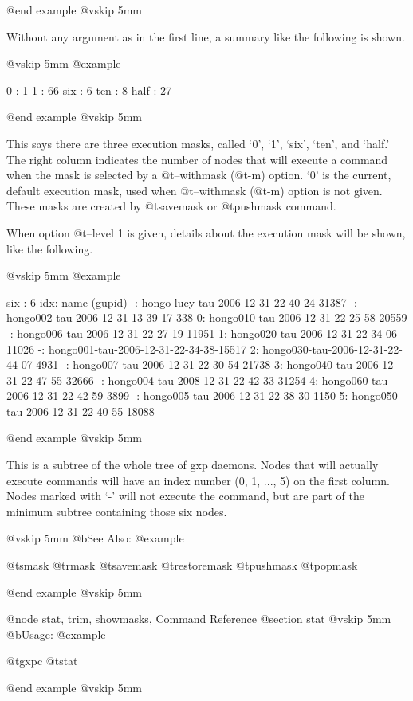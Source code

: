@end example
@vskip 5mm

Without any argument as in the first line, a summary like the
following is shown.

@vskip 5mm
@example

   0 : 1
   1 : 66
   six : 6
   ten : 8
   half : 27

@end example
@vskip 5mm

This says there are three execution masks, called `0', `1',
`six', `ten', and `half.' The right column indicates the number
of nodes that will execute a command when the mask is selected by
a @t{--withmask} (@t{-m}) option. `0' is the current, default execution
mask, used when @t{--withmask} (@t{-m}) option is not given. These
masks are created by @t{savemask} or @t{pushmask} command.

When option @t{--level} 1 is given, details about the execution mask
will be shown, like the following.

@vskip 5mm
@example

  six : 6
   idx: name (gupid)
     -: hongo-lucy-tau-2006-12-31-22-40-24-31387
     -:  hongo002-tau-2006-12-31-13-39-17-338
     0:   hongo010-tau-2006-12-31-22-25-58-20559
     -:  hongo006-tau-2006-12-31-22-27-19-11951
     1:   hongo020-tau-2006-12-31-22-34-06-11026
     -:  hongo001-tau-2006-12-31-22-34-38-15517
     2:   hongo030-tau-2006-12-31-22-44-07-4931
     -:  hongo007-tau-2006-12-31-22-30-54-21738
     3:   hongo040-tau-2006-12-31-22-47-55-32666
     -:  hongo004-tau-2008-12-31-22-42-33-31254
     4:   hongo060-tau-2006-12-31-22-42-59-3899
     -:  hongo005-tau-2006-12-31-22-38-30-1150
     5:   hongo050-tau-2006-12-31-22-40-55-18088

@end example
@vskip 5mm

This is a subtree of the whole tree of gxp daemons.  Nodes that will
actually execute commands will have an index number (0, 1, ..., 5) on
the first column. Nodes marked with `-' will not execute the
command, but are part of the minimum subtree containing those six
nodes.

@vskip 5mm
@b{See Also:}
@example

  @t{smask} @t{rmask} @t{savemask} @t{restoremask} @t{pushmask} @t{popmask}

@end example
@vskip 5mm

@node stat, trim, showmasks, Command Reference
@section stat
@vskip 5mm
@b{Usage:}
@example

  @t{gxpc} @t{stat}

@end example
@vskip 5mm

